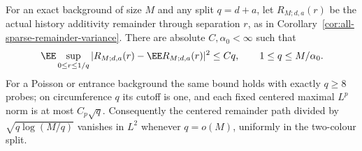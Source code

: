 \documentclass[11pt,letterpaper]{article}
\begin{document}
\begin{theorem}
\label{thm:early-remainder-maximal}
For an exact background of size $M$ and any split $q=d+a$,
let $R_{M;d,a}(r)$ be the actual history additivity remainder
through separation $r$, as in
Corollary~\ref{cor:all-sparse-remainder-variance}.
There are absolute $C,\alpha_0<\infty$ such that
\begin{equation}\label{eq:early-remainder-maximal}
 \EE\sup_{0\le r\le1/q}
       |R_{M;d,a}(r)-\EE R_{M;d,a}(r)|^2\le Cq,
                  \qquad 1\le q\le M/\alpha_0.
\end{equation}
For a Poisson or entrance background the same bound holds
with exactly $q\ge8$ probes; on circumference $q$ its cutoff
is one, and each fixed centered maximal $L^p$ norm is
at most $C_p\sqrt q$.
Consequently the centered remainder path divided by
$\sqrt{q\log(M/q)}$ vanishes in $L^2$ whenever $q=o(M)$,
uniformly in the two-colour split.
\end{theorem}
\end{document}
